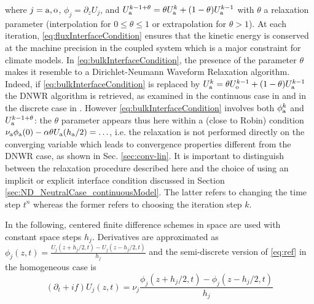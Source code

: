 %
where $j={\rm a},{\rm o}$, $\phi_j = \partial_z U_j$, and 
$U_{\rm a}^{k-1+\theta} = \theta U_{\rm a}^{k} + (1-\theta) U_{\rm a}^{k-1}$
with $\theta$ a relaxation parameter (interpolation for $0\leq \theta \leq 1$ or extrapolation for $\theta>1$). 
%
%
At each iteration, \eqref{eq:fluxInterfaceCondition} ensures that the 
kinetic energy is conserved at the machine precision in the coupled 
system which is a major constraint for climate models. 
In \eqref{eq:bulkInterfaceCondition},
the presence of the parameter $\theta$ makes it resemble to a Dirichlet-Neumann Waveform Relaxation algorithm.
Indeed, if \eqref{eq:bulkInterfaceCondition} is replaced
by $U_{\rm a}^k = \theta U_{\rm o}^{k-1} + (1-\theta) U_{\rm a}^{k-1}$ the DNWR algorithm is retrieved, as examined in the continuous case in \cite{gander_dirichlet-neumann_2014} and in the discrete case in
\cite{meisrimel_time_2020}.
However \eqref{eq:bulkInterfaceCondition}
involves both $\phi_{\rm a}^k$ and 
$U_{\rm a}^{k-1+\theta}$:
the $\theta$ parameter appears thus here within a (close to Robin) condition  
$\nu_{\rm a} \phi_{\rm a}(0) - \alpha \theta U_{\rm a}(h_{\rm a}/2) = \ldots$,
i.e. the relaxation is not performed directly on the converging variable
which leads to convergence properties different from the DNWR case, 
as shown in Sec. \ref{sec:conv-lin}.
It is important to distinguish between the relaxation
procedure described here and the choice of using an implicit or
explicit interface condition discussed in Section
\ref{sec:ND_NeutralCase_continuousModel}.
The latter refers to changing the time step $t^n$ whereas the former
refers to choosing the iteration step $k$.
\par
%
In the following, centered finite difference schemes in space are used with constant space steps $h_j$.
Derivatives are approximated as $\phi_j(z,t) = \frac{U_j(z+h_j/2,t) - U_j(z-h_j/2, t)}{h_j}$
and the semi-discrete version of \eqref{eq:ref} in the homogeneous case is
\begin{equation}\label{eq:spaceTimeScheme}
(\partial_t + if) U_j (z, t) = \nu_j \frac{\phi_j(z+h_j/2,t) - \phi_j(z-h_j/2,t)}{h_j}
\end{equation}

